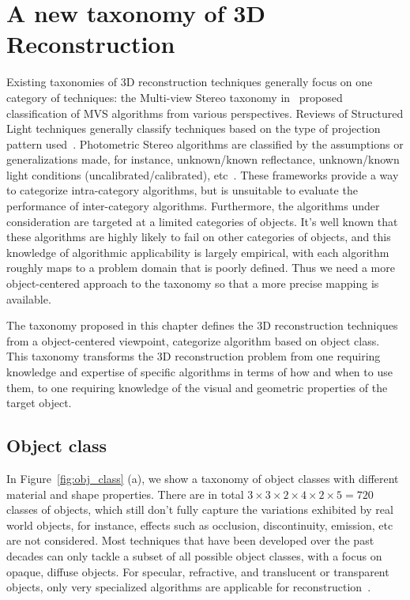
\chapter{A new taxonomy of 3D Reconstruction}
\label{ch:3DRecon_Taxo}
Existing taxonomies of 3D reconstruction techniques generally focus on one category of techniques: the Multi-view Stereo taxonomy in~\cite{seitz2006comparison} proposed classification of MVS algorithms from various perspectives. Reviews of Structured Light techniques generally classify techniques based on the type of projection pattern used~\cite{geng2011structured, salvi2004pattern}. Photometric Stereo algorithms are classified by the assumptions or generalizations made, for instance, unknown/known reflectance, unknown/known light conditions (uncalibrated/calibrated), etc~\cite{shi2016benchmark}. These frameworks provide a way to categorize intra-category algorithms, but is unsuitable to evaluate the performance of inter-category algorithms. Furthermore, the algorithms under consideration are targeted at a limited categories of objects. It's well known that these algorithms are highly likely to fail on other categories of objects, and this knowledge of algorithmic applicability is largely empirical, with each algorithm roughly maps to a problem domain that is poorly defined. Thus we need a more object-centered approach to the taxonomy so that a more precise mapping is available.

The taxonomy proposed in this chapter defines the 3D reconstruction techniques from a object-centered viewpoint, \ie categorize algorithm based on object class. This taxonomy transforms the 3D reconstruction problem from one requiring knowledge and expertise of specific algorithms in terms of how and when to use them, to one requiring knowledge of the visual and geometric properties of the target object.

\section{Object class}
In Figure~\ref{fig:obj_class} (a), we show a taxonomy of object classes with different material and shape properties. There are in total $3\times 3\times 2\times4\times 2\times 5 = 720$ classes of objects, which still don't fully capture the variations exhibited by real world objects, for instance, effects such as occlusion, discontinuity, emission, etc are not considered. Most techniques that have been developed over the past decades can only tackle a subset of all possible object classes, with a focus on opaque, diffuse objects. For specular, refractive, and translucent or transparent objects, only very specialized algorithms are applicable for reconstruction~\cite{ihrke2010transparent}.


